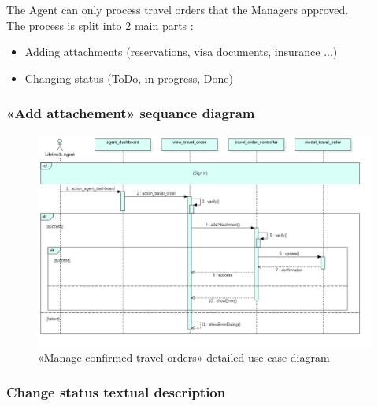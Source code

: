 The Agent can only process travel orders that the Managers approved.\\
The process is split into 2 main parts :\\
\begin{itemize}
\item Adding attachments (reservations, visa documents, insurance ...)
\item Changing status (ToDo, in progress, Done)
\end{itemize}
\subsubsection*{«Add attachement» sequance diagram}
\begin{figure}[H]
    \begin{center}
        \includegraphics[scale=0.40]{img/sprint3_attach_sequ.png}
        \caption{«Manage confirmed travel orders» detailed use case diagram}
    \end{center}
        \label{fig:my_label}
\end{figure} 

\subsubsection*{Change status textual description}

